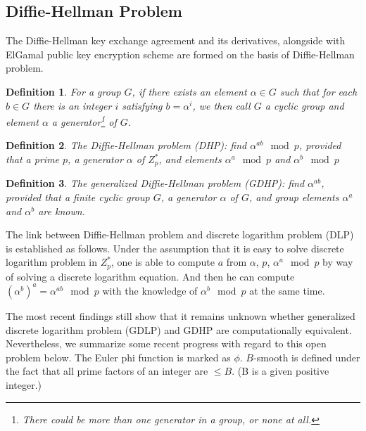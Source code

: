 \documentclass[12pt,journal,compsoc]{IEEEtran}
\newtheorem{definition}{Definition}
\begin{document}
\subsection{Diffie-Hellman Problem}
The Diffie-Hellman key exchange agreement and its derivatives,
alongside with ElGamal public key encryption scheme are formed on the
basis of Diffie-Hellman problem. 
\begin{definition}
For a group $G$, if there exists an element $\alpha\in G$ such that
for each $b\in G$ there is an integer $i$ satisfying $b=\alpha^{i}$,
we then call $G$ a cyclic group and element $\alpha$ a
generator\footnote{There could be more than one generator in a group,
  or none at all.} of $G$.\label{sec:diff-hellm-probl} 
\end{definition}
\begin{definition}
The Diffie-Hellman problem (DHP): find
$\alpha^{ab}\mod p$, provided that a prime
$p$, a generator $\alpha$ of $Z^{*}_{p}$, and elements
$\alpha^{a}\mod p$ and $\alpha^{b}\mod
p$\label{sec:diff-hellm-probl-1}
\end{definition}
\begin{definition}
The \emph{generalized Diffie-Hellman problem
  (GDHP)}: find $\alpha^{ab}$, provided that a finite cyclic group
$G$, a generator $\alpha$ of $G$, and group elements $\alpha^{a}$ and
$\alpha^{b}$ are known. \label{sec:diff-hellm-probl-2}
\end{definition}
The link between Diffie-Hellman problem and discrete logarithm problem
(DLP) is established as follows. Under the assumption that it is easy
to solve discrete logarithm problem in $Z^{*}_{p}$, one is able to
compute $a$ from $\alpha$, $p$, $\alpha^{a}\mod p$ by way of solving a
discrete logarithm equation. And then he can compute
${(\alpha^{b})}^{a}=\alpha^{ab}\mod p$ with the knowledge of
$\alpha^{b}\mod p$ at the same time.
\par
The most recent findings still show that it remains unknown whether
generalized discrete logarithm problem (GDLP) and GDHP are
computationally equivalent. Nevertheless, we summarize some recent
progress with regard to this open problem below. The Euler phi
function is marked as $\phi$. $B$-smooth is defined under the fact
that all prime factors of an integer are $\leq B$. (B is a given
positive integer.)
\end{document}
